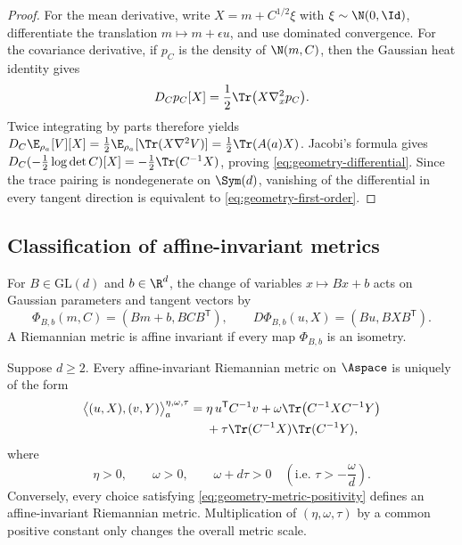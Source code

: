 \begin{proof}
For the mean derivative, write $X=m+C^{1/2}\xi$ with
$\xi\sim\N(0,\Id)$, differentiate the translation $m\mapsto m+\epsilon u$,
and use dominated convergence.  For the covariance derivative, if $p_C$ is
the density of $\N(m,C)$, then the Gaussian heat identity gives
\[
    D_Cp_C[X]=\frac12\Tr\bigl(X\nabla_x^2p_C\bigr).
\]
Twice integrating by parts therefore yields
$D_C\E_{\rho_a}[V][X]=\frac12\E_{\rho_a}
[\Tr(X\nabla^2V)]=\frac12\Tr(A(a)X)$.  Jacobi's formula gives
$D_C(-\frac12\log\det C)[X]=-\frac12\Tr(C^{-1}X)$, proving
\eqref{eq:geometry-differential}.  Since the trace pairing is nondegenerate
on $\Sym(d)$, vanishing of the differential in every tangent direction is
equivalent to \eqref{eq:geometry-first-order}.
\end{proof}

\subsection{Classification of affine-invariant metrics}
\label{sec:geometry-classification}

For $B\in\mathrm{GL}(d)$ and $b\in\R^d$, the change of variables
$x\mapsto Bx+b$ acts on Gaussian parameters and tangent vectors by
\begin{equation}
\label{eq:geometry-affine-action}
    \Phi_{B,b}(m,C)=(Bm+b,BCB^{\mathsf T}),
    \qquad
    D\Phi_{B,b}(u,X)=(Bu,BXB^{\mathsf T}).
\end{equation}
A Riemannian metric is affine invariant if every map $\Phi_{B,b}$ is an
isometry.

\begin{theorem}
\label{thm:geometry-classification}
Suppose $d\geq2$.  Every affine-invariant Riemannian metric on $\Aspace$ is
uniquely of the form
\begin{align}
\label{eq:geometry-metric-family}
    \bigl\langle (u,X),(v,Y)\bigr\rangle_a^{\eta,\omega,\tau}
    ={}&\eta\,u^{\mathsf T}C^{-1}v
      +\omega\Tr\bigl(C^{-1}XC^{-1}Y\bigr) \\
     &+\tau\Tr(C^{-1}X)\Tr(C^{-1}Y),
\end{align}
where
\begin{equation}
\label{eq:geometry-metric-positivity}
    \eta>0,
    \qquad
    \omega>0,
    \qquad
    \omega+d\tau>0
    \quad\left(\text{i.e. }\tau>-\frac{\omega}{d}\right).
\end{equation}
Conversely, every choice satisfying \eqref{eq:geometry-metric-positivity}
defines an affine-invariant Riemannian metric.  Multiplication of
$(\eta,\omega,\tau)$ by a common positive constant only changes the overall
metric scale.
\end{theorem}

